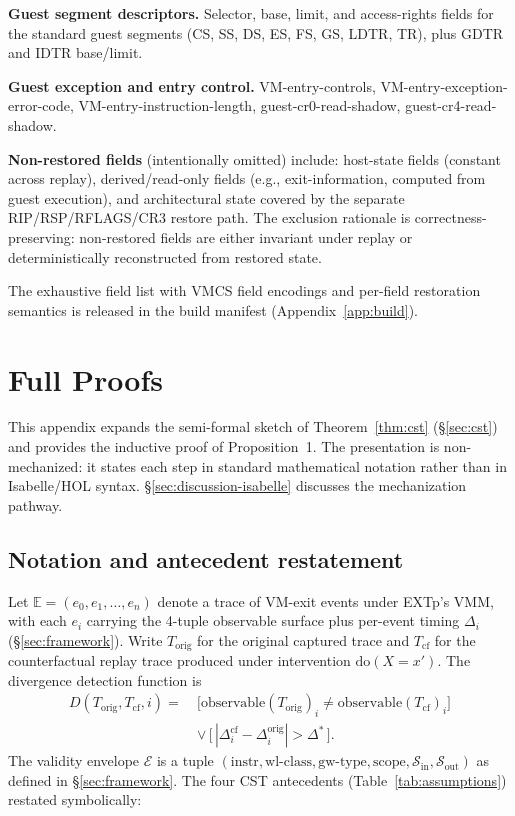 \documentclass[conference]{IEEEtran}
\newcommand{\Korig}{T_\text{orig}}
\newcommand{\Tcf}{T_\text{cf}}
\newcommand{\Dstar}{\Delta^{*}}
\newcommand{\dox}[1]{\text{do}(X{=}#1)}
\begin{document}
\textbf{Guest segment descriptors.} Selector, base, limit, and
access-rights fields for the standard guest segments
(CS, SS, DS, ES, FS, GS, LDTR, TR), plus GDTR and IDTR base/limit.

\textbf{Guest exception and entry control.} VM-entry-controls,
VM-entry-exception-error-code, VM-entry-instruction-length,
guest-cr0-read-shadow, guest-cr4-read-shadow.

\textbf{Non-restored fields} (intentionally omitted) include:
host-state fields (constant across replay), derived/read-only
fields (e.g., exit-information, computed from guest execution),
and architectural state covered by the separate RIP/RSP/RFLAGS/CR3
restore path. The exclusion rationale is correctness-preserving:
non-restored fields are either invariant under replay or
deterministically reconstructed from restored state.

The exhaustive field list with VMCS field encodings and per-field
restoration semantics is released in the build manifest
(Appendix~\ref{app:build}).

\section{Full Proofs}\label{app:proofs}

This appendix expands the semi-formal sketch of
Theorem~\ref{thm:cst} (\S\ref{sec:cst}) and provides the inductive
proof of Proposition~1. The presentation is non-mechanized: it
states each step in standard mathematical notation rather than in
Isabelle/HOL syntax. \S\ref{sec:discussion-isabelle} discusses the
mechanization pathway.

\subsection{Notation and antecedent restatement}

Let $\mathbb{E} = (e_0, e_1, \ldots, e_n)$ denote a trace of
VM-exit events under EXTp's VMM, with each $e_i$ carrying the
4-tuple observable surface plus per-event timing $\Delta_i$
(\S\ref{sec:framework}). Write $\Korig$ for the original captured
trace and $\Tcf$ for the counterfactual replay trace produced
under intervention $\dox{x'}$. The divergence detection function
is
\begin{equation*}
\begin{aligned}
D(\Korig, \Tcf, i) =\ & \big[\text{observable}(\Korig)_i \neq \text{observable}(\Tcf)_i\big] \\
                      & \vee\,\big[\,|\Delta_i^{\text{cf}} - \Delta_i^{\text{orig}}| > \Dstar\,\big].
\end{aligned}
\end{equation*}
The validity envelope $\mathcal{E}$ is a tuple
$(\text{instr}, \text{wl-class}, \text{gw-type}, \text{scope},
\mathcal{S}_\text{in}, \mathcal{S}_\text{out})$ as defined in
\S\ref{sec:framework}. The four CST antecedents
(Table~\ref{tab:assumptions}) restated symbolically:
\end{document}
